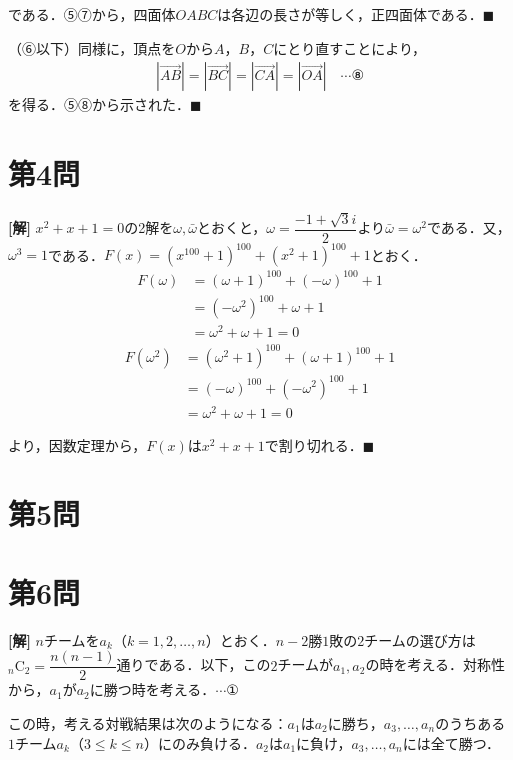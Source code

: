 \documentclass[../main.tex]{subfiles}
\begin{document}
である．⑤⑦から，四面体$OABC$は各辺の長さが等しく，正四面体である．$\blacksquare$

\bigskip
\noindent{\bf [別解]}
（⑥以下）同様に，頂点を$O$から$A$，$B$，$C$にとり直すことにより，
\begin{align*}
  |\overrightarrow{AB}|=|\overrightarrow{BC}|=|\overrightarrow{CA}|=|\overrightarrow{OA}|\quad\cdots⑧
\end{align*}
を得る．⑤⑧から示された．$\blacksquare$

\newpage

\section*{第4問}

{\bf [解]}
$x^2+x+1=0$の2解を$\omega,\bar\omega$とおくと，$\omega=\dfrac{-1+\sqrt3i}2$より$\bar\omega=\omega^2$である．又，$\omega^3=1$である．$F(x)=(x^{100}+1)^{100}+(x^2+1)^{100}+1$とおく．
\begin{align*}
  F(\omega)&=(\omega+1)^{100}+(-\omega)^{100}+1\\
  &=(-\omega^2)^{100}+\omega+1\\
  &=\omega^2+\omega+1=0
\end{align*}
\begin{align*}
  F(\omega^2)&=(\omega^2+1)^{100}+(\omega+1)^{100}+1\\
  &=(-\omega)^{100}+(-\omega^2)^{100}+1\\
  &=\omega^2+\omega+1=0
\end{align*}

より，因数定理から，$F(x)$は$x^2+x+1$で割り切れる．$\blacksquare$

\newpage

\section*{第5問}

\newpage

\section*{第6問}

{\bf [解]}
$n$チームを$a_k$（$k=1,2,\ldots,n$）とおく．$n-2$勝$1$敗の$2$チームの選び方は${}_n\mathrm C_2=\dfrac{n(n-1)}2$通りである．以下，この$2$チームが$a_1,a_2$の時を考える．対称性から，$a_1$が$a_2$に勝つ時を考える．$\cdots①$

この時，考える対戦結果は次のようになる：$a_1$は$a_2$に勝ち，$a_3,\ldots,a_n$のうちある$1$チーム$a_k$（$3\le k\le n$）にのみ負ける．$a_2$は$a_1$に負け，$a_3,\ldots,a_n$には全て勝つ．
\end{document}
